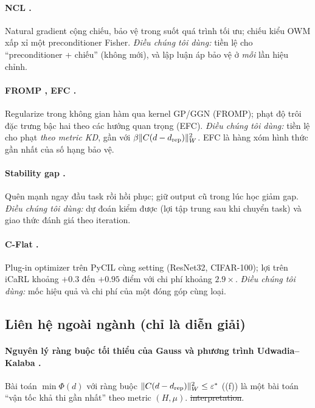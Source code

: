 \paragraph{NCL \cite{kao2021ncl}.} Natural gradient cộng chiếu, bảo vệ trong suốt quá trình tối ưu; chiếu kiểu OWM xấp xỉ một preconditioner Fisher. \emph{Điều chúng tôi dùng:} tiền lệ cho ``preconditioner + chiếu'' (không mới), và lập luận áp bảo vệ ở \emph{mỗi} lần hiệu chỉnh.

\paragraph{FROMP \cite{pan2020fromp}, EFC \cite{magistri2024efc}.} Regularize trong không gian hàm qua kernel GP/GGN (FROMP); phạt độ trôi đặc trưng bậc hai theo các hướng quan trọng (EFC). \emph{Điều chúng tôi dùng:} tiền lệ cho phạt \emph{theo metric KD}, gần với $\beta\lVert C(d-d_{\mathrm{rep}})\rVert_W^2$. EFC là hàng xóm hình thức gần nhất của số hạng bảo vệ.

\paragraph{Stability gap \cite{delange2023gap,harun2024gap}.} Quên mạnh ngay đầu task rồi hồi phục; giữ output cũ trong lúc học giảm gap. \emph{Điều chúng tôi dùng:} dự đoán kiểm được (lợi tập trung sau khi chuyển task) và giao thức đánh giá theo iteration.

\paragraph{C-Flat \cite{bian2024cflat,cflatpp}.} Plug-in optimizer trên PyCIL cùng setting (ResNet32, CIFAR-100); lợi trên iCaRL khoảng $+0.3$ đến $+0.95$ điểm với chi phí khoảng $2.9\times$. \emph{Điều chúng tôi dùng:} mốc hiệu quả và chi phí của một đóng góp cùng loại.

\subsection{Liên hệ ngoài ngành (chỉ là diễn giải)}

\paragraph{Nguyên lý ràng buộc tối thiểu của Gauss và phương trình Udwadia--Kalaba \cite{udwadia1992,udwadia2005}.} Bài toán $\min\Phi(d)$ với ràng buộc $\lVert C(d-d_{\mathrm{rep}})\rVert_W^2\le\varepsilon^*$ ((f)) là một bài toán ``vận tốc khả thi gần nhất'' theo metric $(H,\mu)$. \st{interpretation}.

